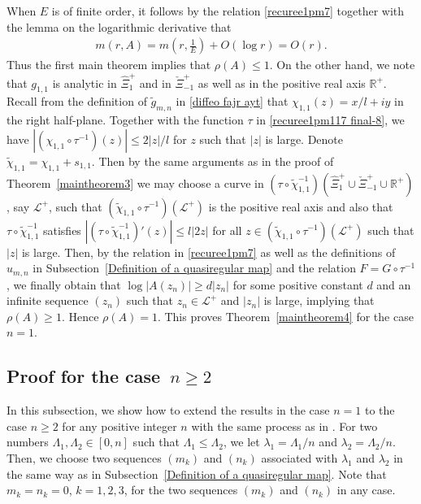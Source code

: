 \documentclass[12pt]{amsart}
\numberwithin{equation}{section}
\begin{document}
When $E$ is of finite order, it follows by the relation \eqref{recuree1pm7} together with the lemma on the logarithmic derivative that
\begin{equation*}
\begin{split}
m(r,A)=m\left(r,\frac{1}{E}\right)+O(\log r)=O(r).
\end{split}
\end{equation*}
Thus the first main theorem implies that $\rho(A)\leq 1$. On the other hand, we note that $g_{1,1}$ is analytic in $\hat{\Xi}_1^{+}$ and in $\check{\Xi}_{-1}^{+}$ as well as in the positive real axis $\mathbb{R}^{+}$. Recall from the definition of $\tilde{g}_{m,n}$ in \eqref{diffeo  fajr  ayt} that $\chi_{1,1}(z)=x/l+iy$ in the right half-plane. Together with the function $\tau$ in \eqref{recuree1pm117 final-8}, we have $|(\chi_{1,1}\circ\tau^{-1})(z)|\leq 2|z|/l$ for $z$ such that $|z|$ is large. Denote $\tilde{\chi}_{1,1}=\chi_{1,1}+s_{1,1}$. Then by the same arguments as in the proof of Theorem~\ref{maintheorem3} we may choose a curve in $(\tau\circ\tilde{\chi}_{1,1}^{-1})(\hat{\Xi}_1^{+}\cup\check{\Xi}_{-1}^{+}\cup \mathbb{R}^{+})$, say $\mathcal{L}^{+}$, such that $(\tilde{\chi}_{1,1}\circ\tau^{-1})(\mathcal{L}^{+})$ is the positive real axis and also that $\tau\circ\tilde{\chi}_{1,1}^{-1}$ satisfies $|(\tau\circ\tilde{\chi}_{1,1}^{-1})'(z)|\leq l|2z|$ for all $z\in (\tilde{\chi}_{1,1}\circ\tau^{-1})(\mathcal{L}^{+})$ such that $|z|$ is large. Then, by the relation in \eqref{recuree1pm7} as well as the definitions of $u_{m,n}$ in Subsection~\ref{Definition of a quasiregular map} and the relation $F=G\circ \tau^{-1}$,
we finally obtain that $\log |A(z_n)|\geq d|z_n|$ for some positive constant $d$ and an infinite sequence $(z_n)$ such that $z_n\in\mathcal{L}^{+}$ and $|z_n|$ is large, implying that $\rho(A)\geq 1$. Hence $\rho(A)=1$. This proves Theorem~\ref{maintheorem4} for the case $n=1$.

\subsection{Proof for the case~$n\geq 2$}\label{Completion of the proof-ex} %

In this subsection, we show how to extend the results in the case $n=1$ to the case $n\geq 2$ for any positive integer $n$ with the same process as in \cite[Section~5]{Bergweilereremenko2019}. For two numbers $\Lambda_1,\Lambda_2\in[0,n]$ such that $\Lambda_1\leq \Lambda_2$, we let $\lambda_1=\Lambda_1/n$ and $\lambda_2=\Lambda_2/n$. Then, we choose two sequences $(m_k)$ and $(n_k)$ associated with $\lambda_1$ and $\lambda_2$ in the same way as in Subsection~\ref{Definition of a quasiregular map}. Note that $m_k=n_k=0$, $k=1,2,3$, for the two sequences $(m_k)$ and $(n_k)$ in any case.
\end{document}
